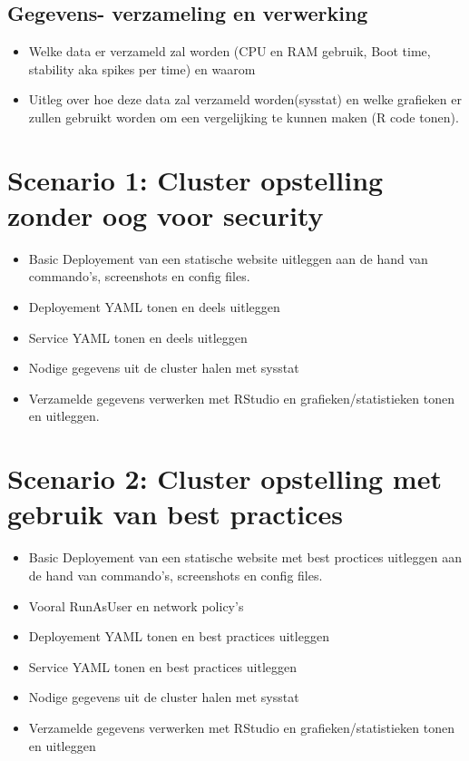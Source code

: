 	
\subsection{Gegevens- verzameling en verwerking}
\begin{itemize}
	\item Welke data er verzameld zal worden (CPU en RAM gebruik, Boot time, stability aka spikes per time) en waarom
 	\item Uitleg over hoe deze data zal verzameld worden(sysstat) en welke grafieken er zullen gebruikt worden om een vergelijking te kunnen maken (R code tonen).
\end{itemize}



\clearpage
\section{Scenario 1: Cluster opstelling zonder oog voor security}
\begin{itemize}
\item Basic Deployement van een statische website uitleggen aan de hand van commando's, screenshots en config files. 
\item Deployement YAML tonen en deels uitleggen
\item Service YAML tonen en deels uitleggen
\item Nodige gegevens uit de cluster halen met sysstat
\item Verzamelde gegevens verwerken met RStudio en grafieken/statistieken tonen en uitleggen.
\end{itemize}



\clearpage
\section{Scenario 2: Cluster opstelling met gebruik van best practices}
\begin{itemize}
	\item Basic Deployement van een statische website met best proctices uitleggen aan de hand van commando's, screenshots en config files. 
	\item Vooral RunAsUser en network policy's
	\item Deployement YAML tonen en best practices uitleggen
	\item Service YAML tonen en best practices uitleggen
	\item Nodige gegevens uit de cluster halen met sysstat
	\item Verzamelde gegevens verwerken met RStudio en grafieken/statistieken tonen en uitleggen
\end{itemize}


